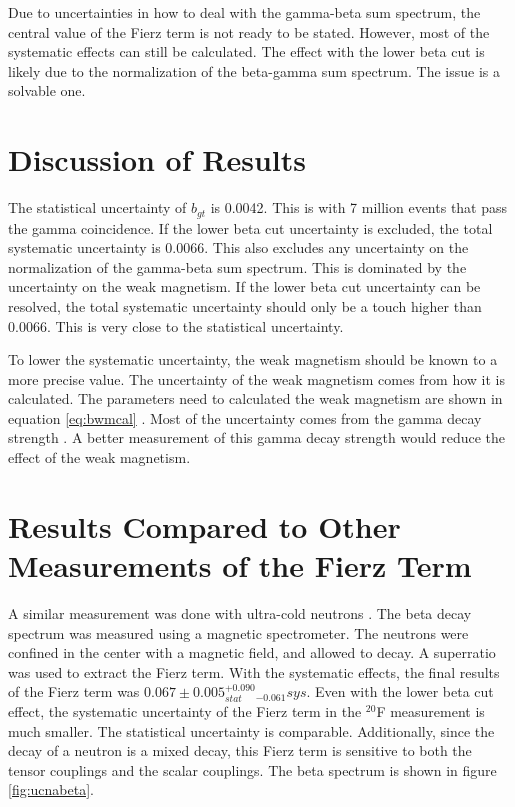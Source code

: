 \documentclass[main.tex]{subfiles}
\begin{document}
Due to uncertainties in how to deal with the gamma-beta sum spectrum, the central value of the Fierz term is not ready to be stated. 
However, most of the systematic effects can still be calculated.
The effect with the lower beta cut is likely due to the normalization of the beta-gamma sum spectrum.
The issue is a solvable one. 

\section{Discussion of Results}

The statistical uncertainty of $b_{gt}$ is 0.0042.
This is with 7 million events that pass the gamma coincidence.
If the lower beta cut uncertainty is excluded, the total systematic uncertainty is 0.0066.
This also excludes any uncertainty on the normalization of the gamma-beta sum spectrum.
This is dominated by the uncertainty on the weak magnetism.
If the lower beta cut uncertainty can be resolved, the total systematic uncertainty should only be a touch higher than 0.0066.
This is very close to the statistical uncertainty. 

To lower the systematic uncertainty, the weak magnetism should be known to a more precise value.
The uncertainty of the weak magnetism comes from how it is calculated.
The parameters need to calculated the weak magnetism are shown in equation \ref{eq:bwmcal} .
Most of the uncertainty comes from the gamma decay strength \cite{Min11}.
A better measurement of this gamma decay strength would reduce the effect of the weak magnetism.

\section{Results Compared to Other Measurements of the Fierz Term}

A similar measurement was done with ultra-cold neutrons \cite{Hic17}.
The beta decay spectrum was measured using a magnetic spectrometer.
The neutrons were confined in the center with a magnetic field, and allowed to decay.
A superratio was used to extract the Fierz term.
With the systematic effects, the final results of the Fierz term was $0.067 \pm 0.005_{stat}  ^{+0.090}_{-0.061} sys$.
Even with the lower beta cut effect, the systematic uncertainty of the Fierz term in the $^{20}$F measurement is much smaller.
The statistical uncertainty is comparable. 
Additionally, since the decay of a neutron is a mixed decay, this Fierz term is sensitive to both the tensor couplings and the scalar couplings.  
The beta spectrum is shown in figure \ref{fig:ucnabeta}.
\end{document}
